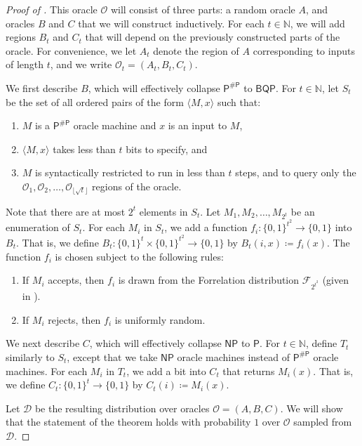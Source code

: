 \documentclass[11pt]{article}%
\newcommand{\Naturals}{\mathbb{N}}
\begin{document}
\begin{proof}[Proof of ]
This oracle $\mathcal{O}$ will consist of three parts: a random oracle $A$, and oracles $B$ and $C$ that we will construct inductively. For each $t \in \Naturals$, we will add regions $B_t$ and $C_t$ that will depend on the previously constructed parts of the oracle. For convenience, we let $A_t$ denote the region of $A$ corresponding to inputs of length $t$, and we write $\mathcal{O}_t = (A_t, B_t, C_t)$.

We first describe $B$, which will effectively collapse $\mathsf{P}^\mathsf{\# P}$ to $\mathsf{BQP}$. For $t \in \Naturals$, let $S_t$ be the set of all ordered pairs of the form $\langle M, x \rangle$ such that:
\begin{enumerate}
\item $M$ is a $\mathsf{P}^\mathsf{\# P}$ oracle machine and $x$ is an input to $M$,
\item $\langle M, x \rangle$ takes less than $t$ bits to specify, and
\item $M$ is syntactically restricted to run in less than $t$ steps, and to query only the $\mathcal{O}_1, \mathcal{O}_2, \ldots, \mathcal{O}_{\lfloor \sqrt{t} \rfloor}$ regions of the oracle.
\end{enumerate}
Note that there are at most $2^t$ elements in $S_t$. Let $M_1, M_2, \ldots, M_{2^t}$ be an enumeration of $S_t$. For each $M_i$ in $S_t$, we add a function $f_i: \{0,1\}^{t^2} \to \{0,1\}$ into $B_t$. That is, we define $B_t: \{0,1\}^t \times \{0,1\}^{t^2} \to \{0,1\}$ by $B_t(i, x) \coloneqq f_i(x)$. The function $f_i$ is chosen subject to the following rules:
\begin{enumerate}
\item If $M_i$ accepts, then $f_i$ is drawn from the Forrelation distribution $\mathcal{F}_{2^{t^2}}$ (given in ).
\item If $M_i$ rejects, then $f_i$ is uniformly random.
\end{enumerate}
We next describe $C$, which will effectively collapse $\mathsf{NP}$ to $\mathsf{P}$. For $t \in \Naturals$, define $T_t$ similarly to $S_t$, except that we take $\mathsf{NP}$ oracle machines instead of $\mathsf{P}^\mathsf{\# P}$ oracle machines. For each $M_i$ in $T_t$, we add a bit into $C_t$ that returns $M_i(x)$. That is, we define $C_t: \{0,1\}^t \to \{0,1\}$ by $C_t(i) \coloneqq M_i(x)$.

Let $\mathcal{D}$ be the resulting distribution over oracles $\mathcal{O} = (A, B, C)$. We will show that the statement of the theorem holds with probability $1$ over $\mathcal{O}$ sampled from $\mathcal{D}$.


\end{proof}
\end{document}
